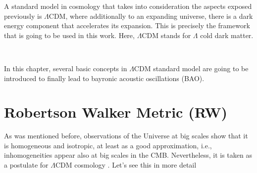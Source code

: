 A standard model in cosmology that takes into consideration the aspects exposed previously is 
$\Lambda$CDM, where additionally to an expanding universe, there is a dark energy component that accelerates its expansion. This is precisely the framework that is going to be used in this work. 
Here, $\Lambda$CDM stands for $\Lambda$ cold dark matter. 

\

In this chapter, several basic concepts in $\Lambda$CDM standard model are going to 
be introduced to finally lead to bayronic acoustic oscillations (BAO). 

\section{ Robertson Walker Metric (RW)}

As was mentioned before, observations of the Universe at big scales show 
that it is homogeneous and isotropic, at least as a good approximation, i.e., 
inhomogeneities appear also at big scales in the CMB. Nevertheless, it is taken
as a postulate for $\Lambda$CDM cosmology . Let's see this in more detail

